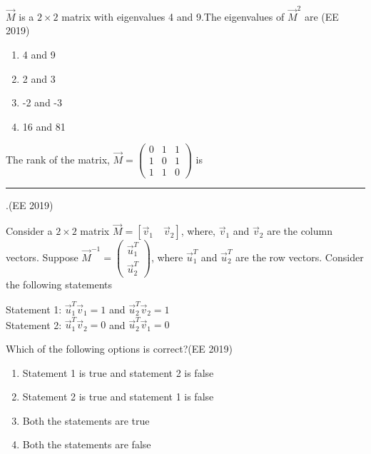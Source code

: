 \item $\vec{M}$ is  a $2\times  2 $ matrix with eigenvalues 4 and 9.The eigenvalues of $\vec{M}^{2}$ are \hfill{(EE 2019)}
\begin{multicols}{4}
\begin{enumerate}
\item 4 and 9
\item 2 and 3
\item -2 and -3
\item 16 and 81
\end{enumerate}
\end{multicols}
\item The rank of the matrix, $\vec{M} =  \begin{pmatrix}
0 & 1 & 1\\
1 & 0 & 1\\
1 & 1 & 0
\end{pmatrix}$ is \rule{2cm}{0.15mm}.\hfill{(EE 2019)}
\item Consider a $2 \times 2$ matrix $ \vec{M} = [\vec{v}_1 \quad \vec{v}_2]$, where, $\vec{v}_1$ and $\vec{v}_2$ are the column vectors. Suppose $\vec{M}^{-1} =  \begin{pmatrix} \vec{u}_1^T \\ \vec{u}_2^T \end{pmatrix}$, where $\vec{u}_1^T$ and $\vec{u}_2^T$ are the row vectors. Consider the following statements

Statement 1: $\vec{u}_1^T \vec{v}_1 = 1$ and $\vec{u}_2^T \vec{v}_2 = 1$ \\
Statement 2: $\vec{u}_1^T \vec{v}_2 = 0$ and $\vec{u}_2^T \vec{v}_1 = 0$

Which of the following options is correct?\hfill{(EE 2019)}
\begin{enumerate}
    \item Statement 1 is true and statement 2 is false
    \item Statement 2 is true and statement 1 is false
    \item Both the statements are true
    \item Both the statements are false
\end{enumerate}

